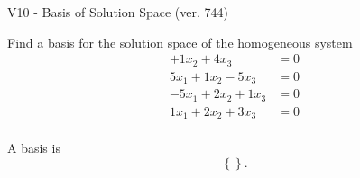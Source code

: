 \begin{exercise}
  \begin{exerciseTitle}V10 - Basis of Solution Space (ver. 744)\end{exerciseTitle}
  \begin{exerciseStatement}
    Find a basis for the solution space of the homogeneous system 
\begin{align*}
 + 1 x_ 2 + 4 x_ 3 &= 0  \\ 
  5 x_ 1 + 1 x_ 2 -5 x_ 3 &= 0  \\ 
  -5 x_ 1 + 2 x_ 2 + 1 x_ 3 &= 0  \\ 
  1 x_ 1 + 2 x_ 2 + 3 x_ 3 &= 0  \\ 
 \end{align*}


 
  \end{exerciseStatement}

  \begin{exerciseAnswer}
   A basis is   
\[\left\{\right\}.\]

  


  \end{exerciseAnswer}
\end{exercise}